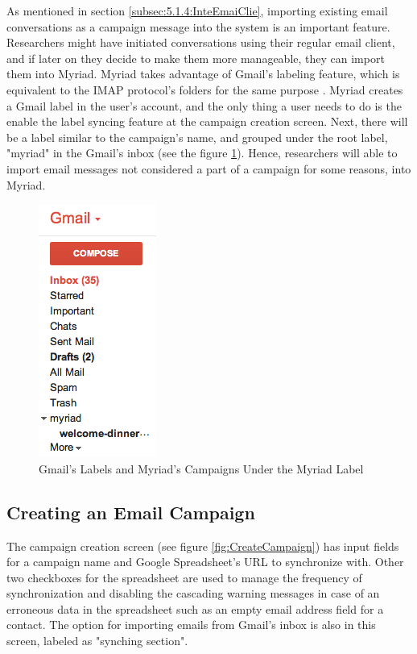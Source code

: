 As mentioned in section \ref{subsec:5.1.4:InteEmaiClie}, importing existing email conversations as a campaign message into the system is an important feature. Researchers might have initiated conversations using their regular email client, and if later on they decide to make them more manageable, they can import them into Myriad. Myriad takes advantage of Gmail's labeling feature, which is equivalent to the \ac{IMAP} protocol's folders for the same purpose \citep{GoogleInc.2013}. Myriad creates a Gmail label in the user's account, and the only thing a user needs to do is the enable the label syncing feature at the campaign creation screen. Next, there will be a label similar to the campaign's name, and grouped under the root label, "myriad" in the Gmail's inbox (see the figure \ref{fig:GmailLabels}). Hence, researchers will able to import email messages not considered a part of a campaign for some reasons, into Myriad.

\clearpage

\begin{figure}[htbp]
	\centering
	\includegraphics[scale=0.60]{imgs/GmailLabels.png}
	\caption[Gmail's Labels and Myriad's Campaigns Under the Myriad Label]{Gmail's Labels and Myriad's Campaigns Under the Myriad Label}
	\label{fig:GmailLabels}
\end{figure}

\subsection{Creating an Email Campaign}
\label{subsec:5.2.3:CreaEmaiCamp}

The campaign creation screen (see figure \ref{fig:CreateCampaign}) has input fields for a campaign name and Google Spreadsheet's \ac{URL} to synchronize with. Other two checkboxes for the spreadsheet are used to manage the frequency of synchronization and disabling the cascading warning messages in case of an erroneous data in the spreadsheet such as an empty email address field for a contact. The option for importing emails from Gmail's inbox is also in this screen, labeled as "synching section".

